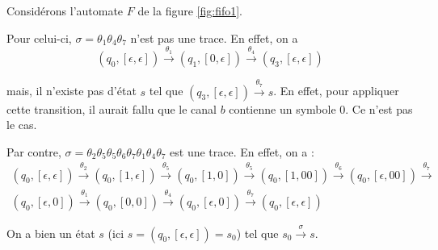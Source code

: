 \begin{example}
  Considérons l'automate $F$ de la figure \ref{fig:fifo1}.

  Pour celui-ci, $\sigma=\theta_1\theta_4\theta_7$ n'est pas une trace. En effet, on a
  $$
  (q_0,[\epsilon,\epsilon])\xrightarrow{\theta_1}(q_1,[0,\epsilon])\xrightarrow{\theta_4}(q_3,[\epsilon,\epsilon])
  $$

  mais, il n'existe pas d'état $s$ tel que $(q_3,[\epsilon,\epsilon])\xrightarrow{\theta_7}s$. En effet, pour appliquer cette transition, il aurait fallu que le canal $b$ contienne un symbole $0$. Ce n'est pas le cas.

  Par contre, $\sigma=\theta_2\theta_5\theta_5\theta_6\theta_7\theta_1\theta_4\theta_7$ est une trace. En effet, on a :
  \begin{equation*}
    \begin{gathered}
      (q_0,[\epsilon,\epsilon])\xrightarrow{\theta_2}
      (q_0,[1,\epsilon])\xrightarrow{\theta_5}
      (q_0,[1,0])\xrightarrow{\theta_5}
      (q_0,[1,00])\xrightarrow{\theta_6}
      (q_0,[\epsilon,00])\xrightarrow{\theta_7}\\
      (q_0,[\epsilon,0])\xrightarrow{\theta_1}
      (q_0,[0,0])\xrightarrow{\theta_4}
      (q_0,[\epsilon,0])\xrightarrow{\theta_7}
      (q_0,[\epsilon,\epsilon])
    \end{gathered}
  \end{equation*}

  On a bien un état $s$ (ici $s=(q_0,[\epsilon,\epsilon])=s_0$) tel que $s_0\xrightarrow{\sigma}s$.

\end{example}
